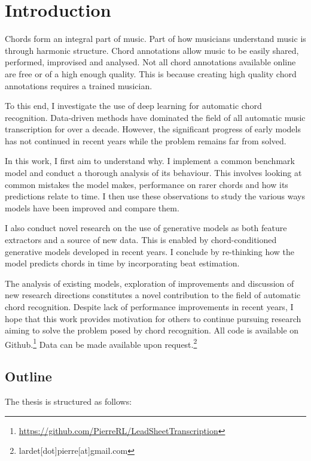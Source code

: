 \chapter{Introduction}

Chords form an integral part of music. Part of how musicians understand music is through harmonic structure. Chord annotations allow music to be easily shared, performed, improvised and analysed. Not all chord annotations available online are free or of a high enough quality. This is because creating high quality chord annotations requires a trained musician. 

To this end, I investigate the use of deep learning for automatic chord recognition. Data-driven methods have dominated the field of all automatic music transcription for over a decade. However, the significant progress of early models has not continued in recent years while the problem remains far from solved.

In this work, I first aim to understand why. I implement a common benchmark model and conduct a thorough analysis of its behaviour. This involves looking at common mistakes the model makes, performance on rarer chords and how its predictions relate to time. I then use these observations to study the various ways models have been improved and compare them. 

I also conduct novel research on the use of generative models as both feature extractors and a source of new data. This is enabled by chord-conditioned generative models developed in recent years. I conclude by re-thinking how the model predicts chords in time by incorporating beat estimation. 

The analysis of existing models, exploration of improvements and discussion of new research directions constitutes a novel contribution to the field of automatic chord recognition. Despite lack of performance improvements in recent years, I hope that this work provides motivation for others to continue pursuing research aiming to solve the problem posed by chord recognition. All code is available on Github.\footnote{\url{https://github.com/PierreRL/LeadSheetTranscription}} Data can be made available upon request.\footnote{lardet[dot]pierre[at]gmail.com}

\section{Outline}

The thesis is structured as follows:

